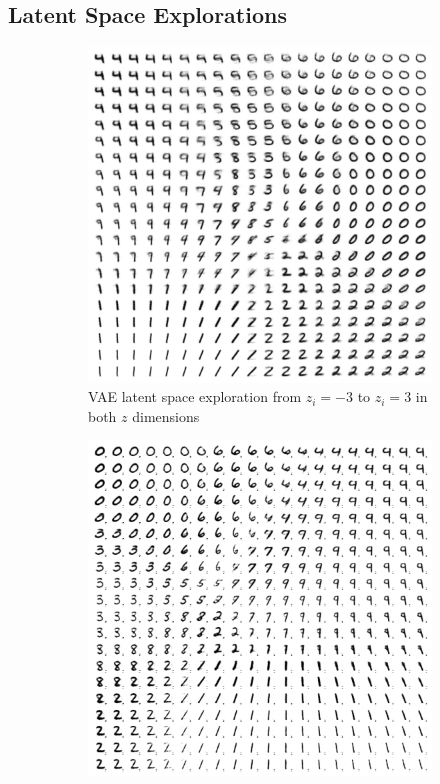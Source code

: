 \documentclass{beamer}
\begin{document}
\subsection{Latent Space Explorations}
\begin{frame}
\begin{figure}
\centering
\begin{subfigure}{.45\textwidth}
\centering
\includegraphics[width=\textwidth]{images/latent_space_traversals/vae_mnist.png}
\caption{VAE latent space exploration from $z_i=-3$ to $z_i=3$ in both $z$ dimensions}
\end{subfigure}
\hfill
\begin{subfigure}{.45\textwidth}
\centering
\includegraphics[width=\textwidth]{images/latent_space_traversals/vae_gan_mnist.png}

\end{subfigure}
\end{figure}
\end{frame}
\end{document}

